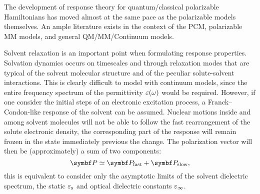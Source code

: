 The development of response theory for quantum/classical polarizable
Hamiltonians has moved almost at the same pace as the polarizable
models themselves.
An ample literature exists in the context of the
\acrshort{PCM},\autocite{Cammi1994-qj, Cammi1996-wf, Cammi1996-vx,
Cammi1999-rb, Cammi2003-qy, Frediani2005-nc, Ferrighi2010-pm}
polarizable \acrshort{MM} models,\autocite{Curutchet2009-bt, Olsen2010-wa,
Lipparini2012-hx, Lipparini2012-tl}
and general \acrshort*{QM}/\acrshort*{MM}/Continuum models.\autocite{Steindal2011-ki, Caprasecca2012-ir, Lipparini2013-ud}

Solvent relaxation is an important point when formulating response
properties. Solvation dynamics occurs on timescales and through
relaxation modes that are typical of the solvent molecular structure and of the
peculiar solute-solvent interactions.
This is clearly difficult to model with continuum models, since the
entire frequency spectrum of the permittivity $\varepsilon(\omega)$ would be
required.\autocite{Ingrosso2003-ev, Caricato2005-lo,
Mennucci2005-vi, Caricato2006-ba, Corni2015-pe}
However, if one consider the initial steps of an electronic excitation
process, a Franck--Condon-like response of the solvent can be assumed.
Nuclear motions inside and among solvent molecules will not be able to
follow the fast rearrangement of the solute electronic density, the
corresponding part of the response will remain frozen in the state
immediately previous the change.
The polarization vector will then be (approximately) a sum of two
components:
\begin{equation}
 \vect{P} \simeq \vect{P}_\mathrm{fast} + \vect{P}_\mathrm{slow},
\end{equation}
this is equivalent to consider only the asymptotic limits of the solvent
dielectric spectrum, \ie the static $\varepsilon_\mathrm{s}$ and optical
dielectric constants $\varepsilon_\infty$.


